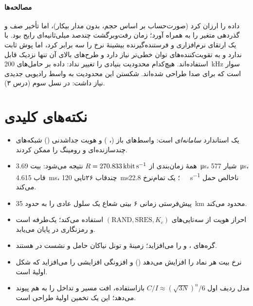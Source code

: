 \documentclass[11pt,a4paper]{article}
\begin{document}
\paragraph{مصالحه‌ها}  داده را ارزان کرد (صورت‌حساب بر اساس حجم، بدون مدار بیکار)،
اما تأخیر صف و گذردهی متغیر را به همراه آورد؛ زمان رفت‌وبرگشت چندصد میلی‌ثانیه‌ای رایج بود.
 با یک ارتقای نرم‌افزاری و فرستنده‌گیرنده بیشینهٔ نرخ را سه برابر کرد، اما
 پوش ثابت ندارد و به تقویت‌کننده‌های توان خطی‌تر نیاز دارد و طرح‌های بالای آن تنها
نزدیک  قابل استفاده‌اند. هیچ‌کدام محدودیت بنیادی را تغییر نداد: داده بر حامل‌های
\qty{200}{\kilo\hertz} سوار است که برای صدا طراحی شده‌اند. شکستن این محدودیت به واسط رادیویی
جدیدی نیاز داشت:  در نسل سوم (درس ۳).

\section{نکته‌های کلیدی}\label{sec:takeaways}
\begin{takeawaybox}
\begin{itemize}
  \item {} یک استاندارد \emph{سامانه‌ای} است: واسط‌های باز (، ) و هویت
        جداشدنی () شبکه‌های چندسازنده‌ای و رومینگ را ممکن کردند.
  \item همهٔ زمان‌بندی  از $R = \qty{270.833}{\kilo\bit\per\second}$ نتیجه می‌شود: بیت
        \qty{3.69}{\micro\second}، شیار \qty{577}{\micro\second}، قاب \qty{4.615}{\milli\second}،
        چندقاب ۲۶تایی \qty{120}{\milli\second}؛ یک  تمام‌نرخ \qty{22.8}{\kilo\bit\per\second}
        ناخالص حمل می‌کند.
  \item پیش‌فرستی زمانی ۶ بیتی شعاع یک سلول عادی را به حدود \qty{35}{\kilo\metre} محدود می‌کند.
  \item احراز هویت از سه‌تایی‌های $(\text{RAND},\text{SRES},K_c)$ استفاده می‌کند؛ یک‌طرفه است و
        رمزنگاری در  پایان می‌یابد.
  \item {} گره‌های ،  و  را می‌افزاید؛ زمینهٔ  و
        تونل  نیاکان حامل  و نشست  در  هستند.
  \item {} نرخ بیت هر نماد را افزایش می‌دهد () و افزونگی افزایشی را
        می‌افزاید که شکل اولیهٔ  است.
  \item مدل ردیف اول $C/I \approx (\sqrt{3N})^n/6$ بازاستفاده، افت مسیر و تداخل را به هم پیوند
        می‌دهد؛ این یک تخمین اولیهٔ طراحی است.
\end{itemize}
\end{takeawaybox}
\end{document}
